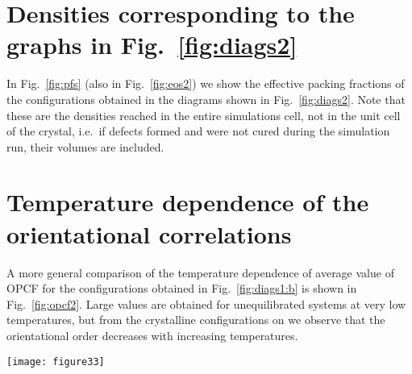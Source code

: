 \documentclass[10pt,aps,pre,twocolumn,superscriptaddress,amsmath,amssymb]{revtex4-1}
\begin{document}
\begin{figure*}
  \centering
  \caption{Equation of state curves in pressures vs. packing fraction representation at different temperatures corresponding to diagrams in Figs.~\ref{fig:diags2:a}, \ref{fig:diags2:b} and \ref{fig:diags2:c}.}
  \label{fig:eos2}
\end{figure*}

\section{Densities corresponding to the graphs in Fig.~\ref{fig:diags2}}

In Fig.~\ref{fig:pfs} (also in Fig.~\ref{fig:eos2}) we show the effective packing fractions of the configurations obtained in the diagrams shown in Fig.~\ref{fig:diags2}. Note that these are the densities reached in the entire simulations cell, not in the unit cell of the crystal, i.e.~if defects formed and were not cured during the simulation run, their volumes are included.

\begin{figure*}
  \centering
  \caption{Packing fractions corresponding to diagrams in Figs.~\ref{fig:diags2:a}, \ref{fig:diags2:b} and \ref{fig:diags2:c}.}
  \label{fig:pfs}
\end{figure*}

\section{Temperature dependence of the orientational correlations}

A more general comparison of the temperature dependence of average value of OPCF for the configurations obtained in Fig.~\ref{fig:diags1:b} is shown in Fig.~\ref{fig:opcf2}.
Large values are obtained for unequilibrated systems at very low temperatures, but from the crystalline configurations on we observe that the orientational order decreases with increasing temperatures.

\begin{figure*}
  \centering
  \texttt{[image: figure33]}
  \caption{Average value of $g_\text{opcf}$ as a function of temperature at different pressures.}
  \label{fig:opcf2}
\end{figure*}
\end{document}
